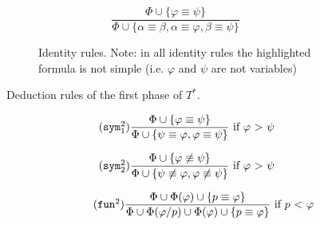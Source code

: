 \documentclass{article}
\theoremstyle{definition}
\newcommand*{\Ts}{T^*}
\newcommand*{\id}{\equiv}
\begin{document}
\begin{figure}
\begin{subfigure}{\textwidth}
\begin{subfigure}{0.4\textwidth}
            \begin{equation}
                \tag{$ \id$}
                \frac{
                    \Phi \cup \{ \varphi \id \psi \} }%
                { \Phi \cup \{ \alpha \id \beta, \alpha \id \varphi, \beta \id \psi \} }
            \end{equation}
        \end{subfigure}
        \caption{Identity rules. Note: in all identity rules the highlighted formula is not simple (i.e. $\varphi$ and $\psi$ are not variables)}
    \end{subfigure}
    \caption{Deduction rules of the first phase of $\Ts$.}
    \label{fig:rules1}
\end{figure}

\begin{figure}
    \begin{subfigure}{\textwidth}
        \centering
        \begin{subfigure}{0.4\textwidth}
            \begin{equation}
                \tag{$\texttt{sym}_1^2$}
                \frac{
                    \Phi \cup \{ \varphi \equiv \psi \} }%
                { \Phi \cup \{\psi \equiv \varphi, \varphi \id \psi \} }
                \text{ if $\varphi$ > $\psi$}
            \end{equation}
        \end{subfigure}
        \begin{subfigure}{0.4\textwidth}
            \begin{equation}
                \tag{$\texttt{sym}_2^2$}
                \frac{
                    \Phi \cup \{ \varphi \not \equiv \psi \}}%
                { \Phi \cup \{\psi \not \equiv \varphi, \varphi \not \id \psi\} }
                \text{ if $\varphi$ > $\psi$}
            \end{equation}
        \end{subfigure}
        \begin{subfigure}{0.55\textwidth}
            \begin{equation}
                \tag{$\texttt{fun}^2$}
                \frac{
                    \Phi \cup \Phi(\varphi) \cup \{ p \equiv \varphi \} }%
                { \Phi \cup \Phi(\varphi / p) \cup \Phi(\varphi) \cup \{p \equiv \varphi\} }
                \text{ if $p$ < $\varphi$}
            \end{equation}
        \end{subfigure}
    \end{subfigure}

\end{figure}
\end{document}
